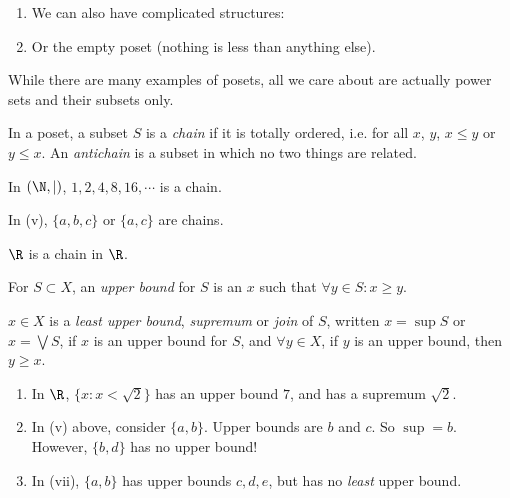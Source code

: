 \documentclass[a4paper]{article}
\begin{document}
\begin{eg}
\begin{enumerate}
\begin{center}
      \end{center}
    \item We can also have complicated structures:
      \begin{center}
      \end{center}
    \item Or the empty poset (nothing is less than anything else).
  \end{enumerate}
\end{eg}
While there are many examples of posets, all we care about are actually power sets and their subsets only.

\begin{defi}
  In a poset, a subset $S$ is a \emph{chain} if it is totally ordered, i.e. for all $x$, $y$, $x\leq y$ or $y\leq x$. An \emph{antichain} is a subset in which no two things are related.
\end{defi}

\begin{eg}
  In $(\N, |)$, $1, 2, 4, 8, 16, \cdots$ is a chain.

  In (v), $\{a, b, c\}$ or $\{a, c\}$ are chains.

  $\R$ is a chain in $\R$.
\end{eg}

\begin{defi}
  For $S\subset X$, an \emph{upper bound} for $S$ is an $x$ such that $\forall y\in S: x \geq y$.

  $x\in X$ is a \emph{least upper bound}, \emph{supremum} or \emph{join} of $S$, written $x = \sup S$ or $x = \bigvee S$, if $x$ is an upper bound for $S$, and $\forall y \in X$, if $y$ is an upper bound, then $y \geq x$.
\end{defi}

\begin{eg}\leavevmode
  \begin{enumerate}
    \item In $\R$, $\{x: x < \sqrt{2}\}$ has an upper bound $7$, and has a supremum $\sqrt{2}$.

    \item In (v) above, consider $\{a, b\}$. Upper bounds are $b$ and $c$. So $\sup  = b$. However, $\{b, d\}$ has no upper bound!
    \item In (vii), $\{a, b\}$ has upper bounds $c, d, e$, but has no \emph{least} upper bound.
  \end{enumerate}
\end{eg}
\end{document}
